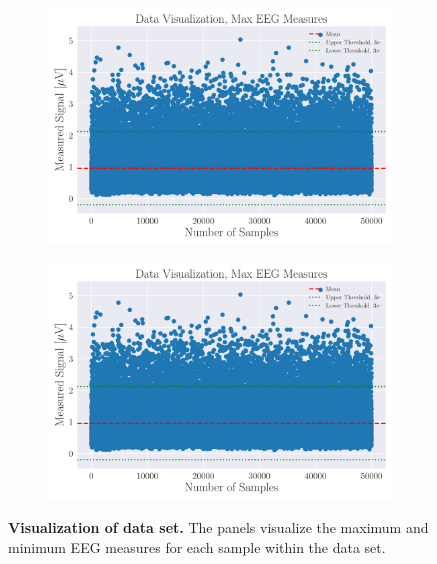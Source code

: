 \documentclass[a4paper, UKenglish, 11pt]{uiomaster}
\begin{document}
\begin{figure}[!htb]
    \centering
    \begin{subfigure}[b]{0.45\linewidth}
        \centering
        \includegraphics[width=\linewidth]{figures/data_visualization_max.pdf}
    \end{subfigure}
    \hfill
    \begin{subfigure}[b]{0.45\linewidth}
        \centering
        \includegraphics[width=\linewidth]{figures/data_visualization_max.pdf}
    \end{subfigure}
    \caption{\textbf{Visualization of data set.} The panels visualize the maximum and minimum EEG measures for each sample within the data set. }
    \label{fig:outliers}
\end{figure}
\end{document}
